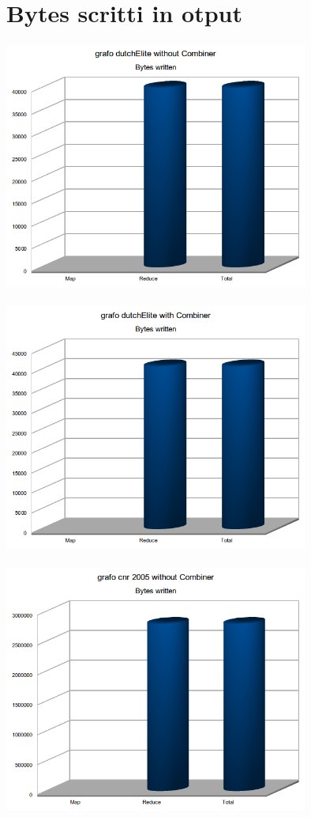 \documentclass[a4paper,11pt]{report}
\begin{document}
\section{Bytes scritti in otput}
\paragraph{}
\centerline{\includegraphics[width=100mm]{images/grafici/deBW.png}}
\paragraph{}
\centerline{\includegraphics[width=100mm]{images/grafici/decombBW.png}}
\paragraph{}
\centerline{\includegraphics[width=100mm]{images/grafici/cnrBW.png}}
\end{document}
